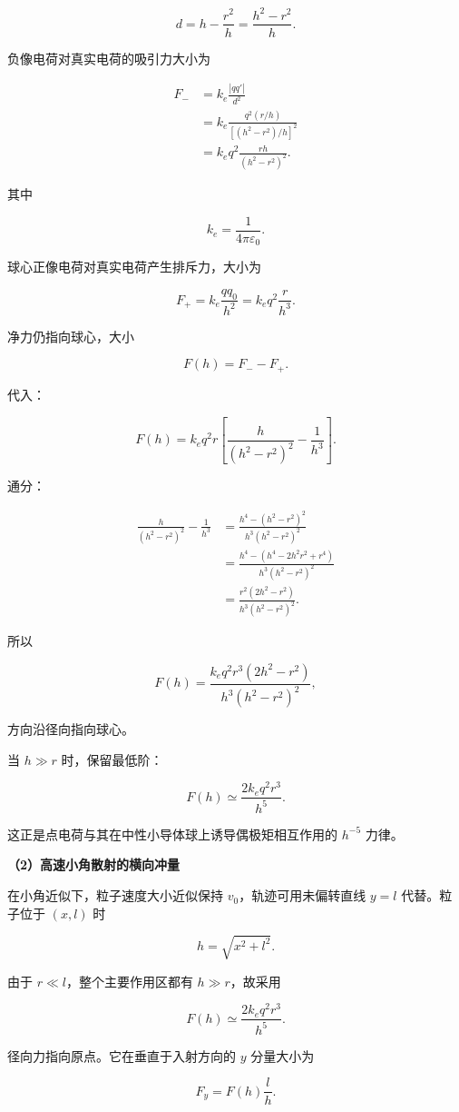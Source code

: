 \documentclass[12pt,a4paper,UTF8]{ctexart}
\begin{document}
\[
d=h-\frac{r^2}{h}=\frac{h^2-r^2}{h}.
\]

负像电荷对真实电荷的吸引力大小为

\[
\begin{aligned}
F_-
&=k_e\frac{|qq'|}{d^2}\\
&=k_e\frac{q^2(r/h)}{[(h^2-r^2)/h]^2}\\
&=k_eq^2\frac{rh}{(h^2-r^2)^2}.
\end{aligned}
\]

其中

\[k_e=\frac{1}{4\pi\varepsilon_0}.\]

球心正像电荷对真实电荷产生排斥力，大小为

\[
F_+=k_e\frac{q q_0}{h^2}
=k_eq^2\frac{r}{h^3}.
\]

净力仍指向球心，大小

\[
F(h)=F_--F_+.
\]

代入：

\[
F(h)=k_eq^2r\left[\frac{h}{(h^2-r^2)^2}-\frac1{h^3}\right].
\]

通分：

\[
\begin{aligned}
\frac{h}{(h^2-r^2)^2}-\frac1{h^3}
&=\frac{h^4-(h^2-r^2)^2}{h^3(h^2-r^2)^2}\\
&=\frac{h^4-(h^4-2h^2r^2+r^4)}{h^3(h^2-r^2)^2}\\
&=\frac{r^2(2h^2-r^2)}{h^3(h^2-r^2)^2}.
\end{aligned}
\]

所以

\[
\boxed{
F(h)=\frac{k_eq^2r^3(2h^2-r^2)}{h^3(h^2-r^2)^2}
},
\]

方向沿径向指向球心。

当 \(h\gg r\) 时，保留最低阶：

\[
F(h)\simeq\frac{2k_eq^2r^3}{h^5}.
\]

这正是点电荷与其在中性小导体球上诱导偶极矩相互作用的 \(h^{-5}\) 力律。

\textbf{（2）高速小角散射的横向冲量}

在小角近似下，粒子速度大小近似保持 \(v_0\)，轨迹可用未偏转直线 \(y=l\)
代替。粒子位于 \((x,l)\) 时

\[
h=\sqrt{x^2+l^2}.
\]

由于 \(r\ll l\)，整个主要作用区都有 \(h\gg r\)，故采用

\[F(h)\simeq\frac{2k_eq^2r^3}{h^5}.\]

径向力指向原点。它在垂直于入射方向的 \(y\) 分量大小为

\[
F_y=F(h)\frac{l}{h}.
\]
\end{document}
